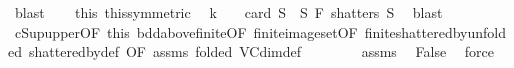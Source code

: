 \begin{isabellebody}
\ blast\isanewline
\ \ \isamarkupfalse%
\ this{\isacharparenleft}{\kern0pt}{}{\isacharparenright}{\kern0pt}\ this{\isacharparenleft}{\kern0pt}{}{\isacharparenright}{\kern0pt}{\isacharbrackleft}{\kern0pt}symmetric{\isacharbrackright}{\kern0pt}\ \isamarkupfalse%
\ {\isachardoublequoteopen}k\ {\isacharplus}{\kern0pt}\ {}\ {\isasymin}\ {\isacharbraceleft}{\kern0pt}card\ S\ {\isacharbar}{\kern0pt}\ S{\isachardot}{\kern0pt}\ F\ shatters\ S{\isacharbraceright}{\kern0pt}{\isachardoublequoteclose}\ \isamarkupfalse%
\ blast\isanewline
\ \ \isamarkupfalse%
\ cSup{\isacharunderscore}{\kern0pt}upper{\isacharbrackleft}{\kern0pt}OF\ this\ bdd{\isacharunderscore}{\kern0pt}above{\isacharunderscore}{\kern0pt}finite{\isacharbrackleft}{\kern0pt}OF\ finite{\isacharunderscore}{\kern0pt}image{\isacharunderscore}{\kern0pt}set{\isacharbrackleft}{\kern0pt}OF\ finite{\isacharunderscore}{\kern0pt}shattered{\isacharunderscore}{\kern0pt}by{\isacharbrackleft}{\kern0pt}unfolded\ shattered{\isacharunderscore}{\kern0pt}by{\isacharunderscore}{\kern0pt}def{\isacharcomma}{\kern0pt}\ OF\ assms{\isacharparenleft}{\kern0pt}{}{\isacharparenright}{\kern0pt}{\isacharbrackright}{\kern0pt}{\isacharbrackright}{\kern0pt}{\isacharbrackright}{\kern0pt}{\isacharcomma}{\kern0pt}\ folded\ VC{\isacharunderscore}{\kern0pt}dim{\isacharunderscore}{\kern0pt}def{\isacharbrackright}{\kern0pt}\ \isanewline
\ \ \ \ \ \ \ assms{\isacharparenleft}{\kern0pt}{}{\isacharparenright}{\kern0pt}\ \isamarkupfalse%
\ False\ \isamarkupfalse%
\ force\isanewline
{}\isamarkupfalse%
%
\endisatagproof
{\isafoldproof}%
%
\isadelimproof
\isanewline
%
\endisadelimproof
%
\isadelimtheory
\isanewline
%
\endisadelimtheory
%
\isatagtheory
{}\isamarkupfalse%
%
\endisatagtheory
{\isafoldtheory}%
%
\isadelimtheory
%
\endisadelimtheory
%
\end{isabellebody}%
\endinput
